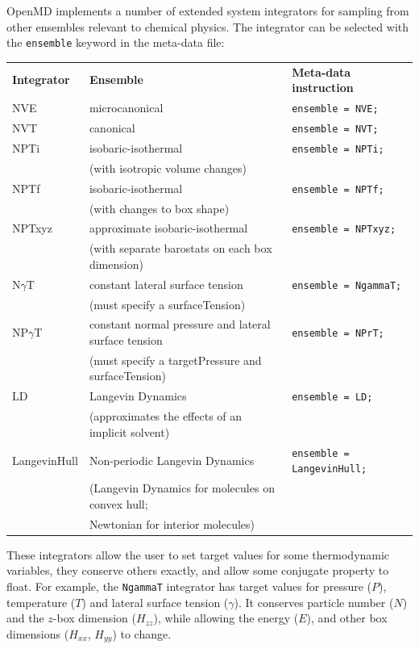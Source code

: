 \documentclass[]{book}
\begin{document}
{\sc OpenMD} implements a number of extended system integrators for
sampling from other ensembles relevant to chemical physics.  The
integrator can be selected with the {\tt ensemble} keyword in the
meta-data file:

\begin{center}
\begin{tabular}{lll}
{\bf Integrator} & {\bf Ensemble} & {\bf Meta-data instruction} \\
NVE & microcanonical & {\tt ensemble = NVE; } \\
NVT & canonical & {\tt ensemble = NVT; } \\
NPTi & isobaric-isothermal & {\tt ensemble = NPTi;} \\
  &  (with isotropic volume changes) & \\
NPTf & isobaric-isothermal & {\tt ensemble = NPTf;} \\
  & (with changes to box shape) & \\
NPTxyz & approximate isobaric-isothermal & {\tt ensemble = NPTxyz;} \\
 &  (with separate barostats on each box dimension) & \\
N$\gamma$T & constant lateral surface tension & {\tt ensemble = NgammaT;} \\
 &  (must specify a surfaceTension) & \\
NP$\gamma$T & constant normal pressure and lateral surface tension & {\tt ensemble = NPrT;} \\
 &  (must specify a targetPressure and surfaceTension) & \\
LD & Langevin Dynamics & {\tt ensemble = LD;} \\
 &  (approximates the effects of an implicit solvent) & \\
 LangevinHull & Non-periodic Langevin Dynamics  & {\tt ensemble = LangevinHull;} \\
 & (Langevin Dynamics for molecules on convex hull;\\
 & Newtonian for interior molecules) & \\
\end{tabular}
\end{center}

These integrators allow the user to set target values for some
thermodynamic variables, they conserve others exactly, and allow some
conjugate property to float. For example, the {\tt NgammaT} integrator
has target values for pressure ($P$), temperature ($T$) and lateral
surface tension ($\gamma$).  It conserves particle number ($N$) and
the $z$-box dimension ($H_{zz}$), while allowing the energy ($E$), and
other box dimensions ($H_{xx}$, $H_{yy}$) to change.
\end{document}
